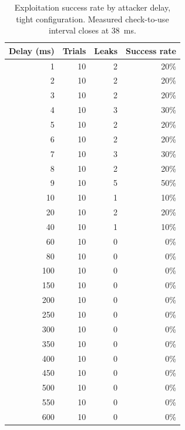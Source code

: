 \begin{table}[ht]
\centering
\begin{tabular}{rrrr}
\hline
Delay (ms) & Trials & Leaks & Success rate \\
\hline
1 & 10 & 2 & 20\% \\
2 & 10 & 2 & 20\% \\
3 & 10 & 2 & 20\% \\
4 & 10 & 3 & 30\% \\
5 & 10 & 2 & 20\% \\
6 & 10 & 2 & 20\% \\
7 & 10 & 3 & 30\% \\
8 & 10 & 2 & 20\% \\
9 & 10 & 5 & 50\% \\
10 & 10 & 1 & 10\% \\
20 & 10 & 2 & 20\% \\
40 & 10 & 1 & 10\% \\
60 & 10 & 0 & 0\% \\
80 & 10 & 0 & 0\% \\
100 & 10 & 0 & 0\% \\
150 & 10 & 0 & 0\% \\
200 & 10 & 0 & 0\% \\
250 & 10 & 0 & 0\% \\
300 & 10 & 0 & 0\% \\
350 & 10 & 0 & 0\% \\
400 & 10 & 0 & 0\% \\
450 & 10 & 0 & 0\% \\
500 & 10 & 0 & 0\% \\
550 & 10 & 0 & 0\% \\
600 & 10 & 0 & 0\% \\
\hline
\end{tabular}
\caption{Exploitation success rate by attacker delay, tight configuration. Measured check-to-use interval closes at 38~ms.}
\label{tab:success-tight}
\end{table}
